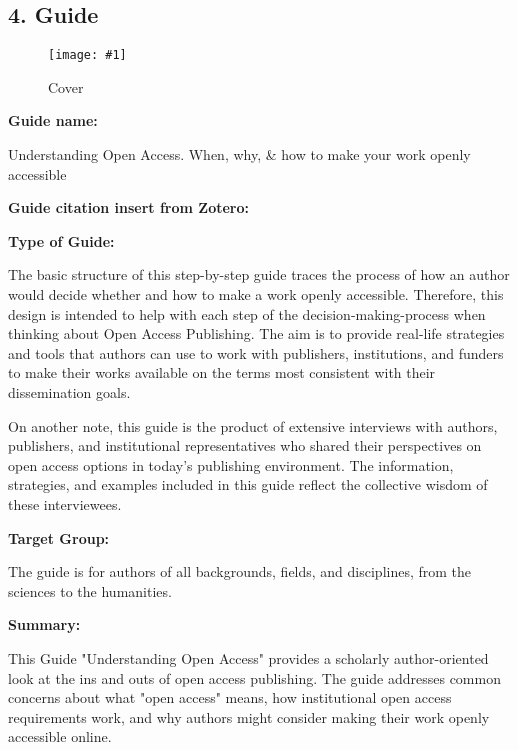 \documentclass{article}
\newlength{\imgwidth}
\newcommand\scaledgraphics[2]{%
                
\settowidth{\imgwidth}{\texttt{[image: \#1]}}%
                
\setlength{\imgwidth}{\minof{\imgwidth}{#2\textwidth}}%
                
\texttt{[image: \#1]}%
                
}
\begin{document}
\subsection{4. Guide}\label{H1144211}


\begin{figure}
\scaledgraphics{37cc2dfd-e350-4e29-acc3-9c7f815eb133.png}{0.5}
\caption*{Cover}\label{F36070241}
\end{figure}




















\textbf{Guide name:} 

Understanding Open Access. When, why, \& how to make your work openly accessible


\textbf{Guide citation insert from Zotero:} 

\autocite{rubow_understanding_2015}


\textbf{Type of Guide:}

The basic structure of this step-by-step guide traces the process of how an author would decide whether and how to make a work openly accessible. Therefore, this design is intended to help with each step of the decision-making-process when thinking about Open Access Publishing. The aim is to provide real-life strategies and tools that authors can use to work with publishers, institutions, and funders to make their works available on the terms most consistent with their dissemination goals.


On another note, this guide is the product of extensive interviews with authors, publishers, and institutional representatives who shared their perspectives on open access options in today’s publishing environment. The information, strategies, and examples included in this guide reflect the collective wisdom of these interviewees.


\textbf{Target Group:}

The guide is for authors of all backgrounds, fields, and disciplines, from the sciences to the humanities.


\textbf{Summary:}

This Guide "Understanding Open Access" provides a scholarly author-oriented look at the ins and outs of open access publishing. The guide addresses common concerns about what "open access" means, how institutional open access requirements work, and why authors might consider making their work openly accessible online. 
\end{document}
